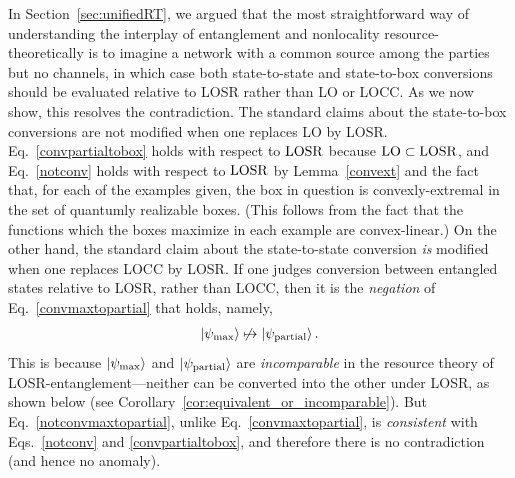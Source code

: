 \documentclass[12pt]{article}
\newcommand{\ket}[1]{\left| #1 \right>}
\newcommand{\LOSR}[0]{\ifmmode\textup{\upshape LOSR}\else{\textup{\upshape LOSR}}\fi}
\newcommand{\LO}[0]{\ifmmode\textup{\upshape LO}\else{\textup{\upshape LO}}\fi}
\theoremstyle{plain}
\theoremstyle{definition}
\begin{document}
In Section~\ref{sec:unifiedRT}, we argued that the most straightforward way of understanding the interplay of entanglement and nonlocality resource-theoretically is to imagine a network with a common source among the parties but no channels, in which case both state-to-state and state-to-box conversions should be evaluated relative to LOSR rather than LO or LOCC. As we now show, this resolves the contradiction. 
The standard claims about the state-to-box conversions are not modified when one replaces LO by LOSR.
Eq.~\eqref{convpartialtobox} holds with respect to $\LOSR$ because $\LO \subset \LOSR$, and Eq.~\eqref{notconv} holds with respect to $\LOSR$  by Lemma~\ref{convext} and the fact that, for each of the examples given, the box in question
  is convexly-extremal in the set of quantumly realizable boxes. (This follows from the fact that the functions which the boxes maximize in each example are convex-linear.)  On the other hand, the standard claim about the state-to-state conversion {\em is} modified when one replaces LOCC by LOSR.
If one judges conversion between entangled states relative to LOSR, rather than LOCC, then it is the {\em negation} of Eq.~\eqref{convmaxtopartial} that holds, namely,
\begin{align} \label{notconvmaxtopartial}
\ket{\psi_{\rm max}} \not\mapsto \ket{\psi_{\rm partial}}.
\end{align}
  This is because $\ket{\psi_{\rm max}}$ and $\ket{\psi_{\rm partial}}$  are {\em incomparable} in the resource theory of LOSR-entanglement---neither can be converted into the other under LOSR,
 as shown below (see Corollary~\ref{cor:equivalent_or_incomparable}).
 But Eq.~\eqref{notconvmaxtopartial}, unlike Eq.~\eqref{convmaxtopartial}, is {\em consistent} with Eqs.~\eqref{notconv} and \eqref{convpartialtobox}, and therefore there is no contradiction (and hence no anomaly).  
 
\end{document}
